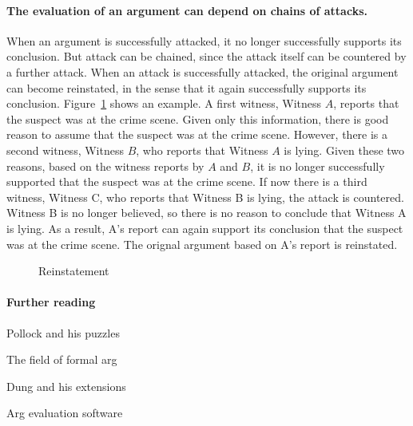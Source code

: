 \documentclass[10pt]{article}
\begin{document}
\paragraph{The evaluation of an argument can depend on chains of attacks.} When an argument is successfully attacked, it no longer successfully supports its conclusion. But attack can be chained, since the attack itself can be countered by a further attack. When an attack is successfully attacked, the original argument can become reinstated, in the sense that it again successfully supports its conclusion. Figure~\ref{fig:reinstatement} shows an example. A first witness, Witness $A$, reports that the suspect was at the crime scene. Given only this information, there is good reason to assume that the suspect was at the crime scene. However, there is a second witness, Witness $B$, who reports that Witness $A$ is lying. Given these two reasons, based on the witness reports by $A$ and $B$, it is no longer successfully supported that the suspect was at the crime scene. If now there is a third witness, Witness C, who reports that Witness B is lying, the attack is countered. Witness B is no longer believed, so there is no reason to conclude that Witness A is lying. As a result, A's report can again support its conclusion that the suspect was at the crime scene. The orignal argument based on A's report is reinstated. 

\begin{figure}[bt]
\centering

\caption{Reinstatement\label{fig:reinstatement}}
\end{figure}


\paragraph{Further reading}
Pollock and his puzzles

The field of formal arg

Dung and his extensions

Arg evaluation software





\end{document}
